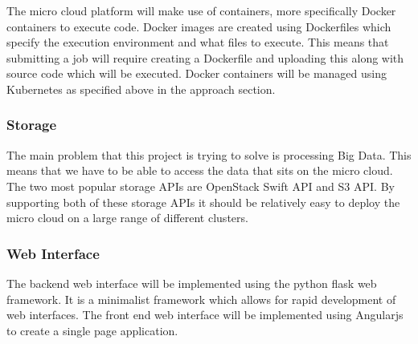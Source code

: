 \documentclass{sig-alternate-05-2015}
\begin{document}
The micro cloud platform will make use of containers, more specifically Docker containers to execute code. Docker images are created using Dockerfiles which specify the execution environment and what files to execute. This means that submitting a job will require creating a Dockerfile and uploading this along with source code which will be executed. 
Docker containers will be managed using Kubernetes as specified above in the approach section.   

\subsubsection{Storage}
The main problem that this project is trying to solve is processing Big Data. This means that we have to be able to access the data that sits on the micro cloud. The two most popular storage APIs are OpenStack Swift API and S3 API. By supporting both of these storage APIs it should be relatively easy to deploy the micro cloud on a large range of different clusters.

\subsubsection{Web Interface}
The backend web interface will be implemented using the python flask web framework. It is a minimalist framework which allows for rapid development of web interfaces. 
The front end web interface will be implemented using Angularjs to create a single page application. 


 
\end{document}

